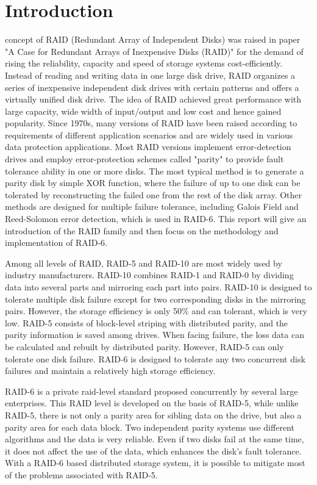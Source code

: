 \documentclass[journal]{IEEEtran}
\begin{document}
\section{Introduction}
 concept of RAID (Redundant Array of Independent Disks) was raised in  paper "A Case for Redundant Arrays of Inexpensive Disks (RAID)"\cite{IEEEhowto:kopka} for the demand of rising the reliability, capacity and speed of storage systems cost-efficiently. Instead of reading and writing data in one large disk drive, RAID organizes a series of inexpensive independent disk drives with certain patterns and offers a virtually unified disk drive. The idea of RAID achieved great performance with large capacity, wide width of input/output and low cost and hence gained popularity. Since 1970s, many versions of RAID have been raised according to requirements of different application scenarios and are widely used in various data protection applications. Most RAID versions implement error-detection drives and employ error-protection schemes called "parity" to provide fault tolerance ability in one or more disks. The most typical method is to generate a parity disk by simple XOR function, where the failure of up to one disk can be tolerated by reconstructing the failed one from the rest of the disk array. Other methods are designed for multiple failure tolerance, including Galois Field and Reed-Solomon error detection, which is used in RAID-6. This report will give an introduction of the RAID family and then focus on the methodology and implementation of RAID-6.

Among all levels of RAID, RAID-5 and RAID-10 are most widely used by industry manufacturers. RAID-10 combines RAID-1 and RAID-0 by dividing data into several parts and mirroring each part into pairs. RAID-10 is designed to tolerate multiple disk failure except for two corresponding disks in the mirroring pairs. However, the storage efficiency is only 50\% and can tolerant, which is very low. RAID-5 consists of block-level striping with distributed parity, and the parity information is saved among drives. When facing failure, the loss data can be calculated and rebuilt by distributed parity. However, RAID-5 can only tolerate one disk failure. RAID-6 is designed to tolerate any two concurrent disk failures and maintain a relatively high storage efficiency.

RAID-6 is a private raid-level standard proposed concurrently by several large enterprises. This RAID level is developed on the basis of RAID-5, while unlike RAID-5, there is not only a parity area for sibling data on the drive, but also a parity area for each data block. Two independent parity systems use different algorithms and the data is very reliable. Even if two disks fail at the same time, it does not affect the use of the data, which enhances the disk’s fault tolerance. With a RAID-6 based distributed storage system, it is possible to mitigate most of the problems associated with RAID-5.
\end{document}
